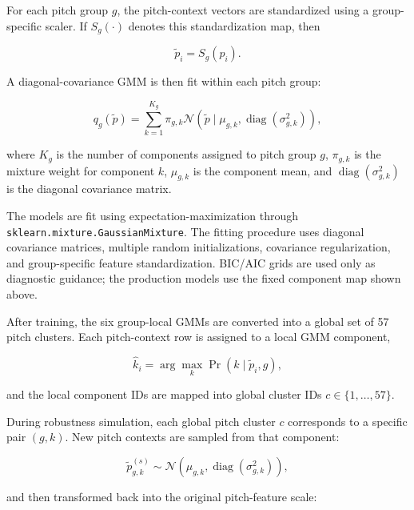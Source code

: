 \documentclass[11pt]{article}
\begin{document}
For each pitch group \(g\), the pitch-context vectors are standardized using a group-specific scaler. If \(S_g(\cdot)\) denotes this standardization map, then

\begin{equation}
    \tilde{p}_i
    =
    S_g(p_i).
\end{equation}

A diagonal-covariance GMM is then fit within each pitch group:

\begin{equation}
    q_g(\tilde{p})
    =
    \sum_{k=1}^{K_g}
    \pi_{g,k}
    \mathcal{N}
    \left(
        \tilde{p}
        \mid
        \mu_{g,k},
        \operatorname{diag}(\sigma^2_{g,k})
    \right),
\end{equation}

where \(K_g\) is the number of components assigned to pitch group \(g\), \(\pi_{g,k}\) is the mixture weight for component \(k\), \(\mu_{g,k}\) is the component mean, and \(\operatorname{diag}(\sigma^2_{g,k})\) is the diagonal covariance matrix.

The models are fit using expectation-maximization through \texttt{sklearn.mixture.GaussianMixture}. The fitting procedure uses diagonal covariance matrices, multiple random initializations, covariance regularization, and group-specific feature standardization. BIC/AIC grids are used only as diagnostic guidance; the production models use the fixed component map shown above.

After training, the six group-local GMMs are converted into a global set of 57 pitch clusters. Each pitch-context row is assigned to a local GMM component,

\begin{equation}
    \hat{k}_i
    =
    \arg\max_k
    \Pr(k \mid \tilde{p}_i, g),
\end{equation}

and the local component IDs are mapped into global cluster IDs \(c \in \{1,\dots,57\}\).

During robustness simulation, each global pitch cluster \(c\) corresponds to a specific pair \((g,k)\). New pitch contexts are sampled from that component:

\begin{equation}
    \tilde{p}^{(s)}_{g,k}
    \sim
    \mathcal{N}
    \left(
        \mu_{g,k},
        \operatorname{diag}(\sigma^2_{g,k})
    \right),
\end{equation}

and then transformed back into the original pitch-feature scale:
\end{document}
